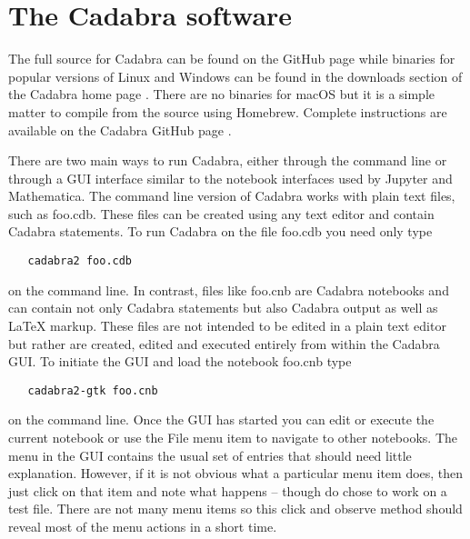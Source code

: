 \documentclass[a4paper,12pt]{article}
\numberwithin{equation}{section}%
\begin{document}
\section*{The Cadabra software}

The full source for Cadabra can be found on the GitHub page \cite{peeters:2017-02} while
binaries for popular versions of Linux and Windows can be found in the downloads section of
the Cadabra home page \cite{peeters:2017-01}. There are no binaries for macOS but it is a
simple matter to compile from the source using Homebrew. Complete instructions are available
on the Cadabra GitHub page \cite{peeters:2017-02}.

There are two main ways to run Cadabra, either through the command line or through a GUI
interface similar to the notebook interfaces used by Jupyter and Mathematica. The command
line version of Cadabra works with plain text files, such as {\tts foo.cdb}. These files can
be created using any text editor and contain Cadabra statements. To run Cadabra on the file
{\tts foo.cdb} you need only type

\bgroup
\lstset{numbers=none}
\begin{lstlisting}
   cadabra2 foo.cdb
\end{lstlisting}
\egroup

on the command line. In contrast, files like {\tts foo.cnb} are Cadabra notebooks and can
contain not only Cadabra statements but also Cadabra output as well as LaTeX markup. These
files are not intended to be edited in a plain text editor but rather are created, edited
and executed entirely from within the Cadabra GUI. To initiate the GUI and load the notebook
{\tts foo.cnb} type

\bgroup
\lstset{numbers=none}
\begin{lstlisting}
   cadabra2-gtk foo.cnb
\end{lstlisting}
\egroup

on the command line. Once the GUI has started you can edit or execute the current notebook or
use the {\tts File} menu item to navigate to other notebooks. The menu in the GUI contains
the usual set of entries that should need little explanation. However, if it is not obvious
what a particular menu item does, then just click on that item and note what happens --
though do chose to work on a test file. There are not many menu items so this click and
observe method should reveal most of the menu actions in a short time.
\end{document}
